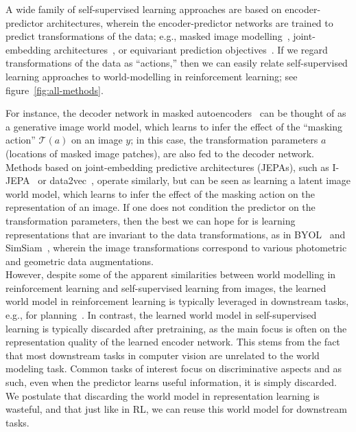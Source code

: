 \documentclass[twocolumn]{fairmeta}
\theoremstyle{plain}
\theoremstyle{definition}
\theoremstyle{remark}
\begin{document}
A wide family of self-supervised learning approaches are based on encoder-predictor architectures, wherein the encoder-predictor networks are trained to predict transformations of the data; e.g., masked image modelling~\citep{bao2021beit,he2021mae}, joint-embedding architectures~\citep{grill2020byol, xie2022simmim, assran2023ijepa, baevski2022data2vec}, or equivariant prediction objectives~\citep{gupta2023care,garrido2023sie}.
If we regard transformations of the data as ``actions,'' then we can easily relate self-supervised learning approaches to world-modelling in reinforcement learning; see figure~\ref{fig:all-methods}.

For instance, the decoder network in masked autoencoders~\citep{he2021mae} can be thought of as a generative image world model, which learns to infer the effect of the ``masking action'' $\mathcal{T}(a)$ on an image $y$; in this case, the transformation parameters $a$ (locations of masked image patches), are also fed to the decoder network.
Methods based on joint-embedding predictive architectures (JEPAs), such as I-JEPA~\citep{assran2023ijepa} or data2vec~\citep{baevski2022data2vec}, operate similarly, but can be seen as learning a latent image world model, which learns to infer the effect of the masking action on the representation of an image.
If one does not condition the predictor on the transformation parameters, then the best we can hope for is learning representations that are invariant to the data transformations, as in BYOL~\citep{grill2020byol} and SimSiam~\citep{chen2020simsiam}, wherein the image transformations correspond to various photometric and geometric data augmentations.\\
However, despite some of the apparent similarities between world modelling in reinforcement learning and self-supervised learning from images, the learned world model in reinforcement learning is typically leveraged in downstream tasks, e.g., for planning~\citep{hansen2022modem}.
In contrast, the learned world model in self-supervised learning is typically discarded after pretraining, as the main focus is often on the representation quality of the learned encoder network.
This stems from the fact that most downstream tasks in computer vision are unrelated to the world modeling task.
Common tasks of interest focus on discriminative aspects and as such, even when the predictor learns useful information, it is simply discarded.
We postulate that discarding the world model in representation learning is wasteful, and that just like in RL, we can reuse this world model for downstream tasks.
\end{document}
